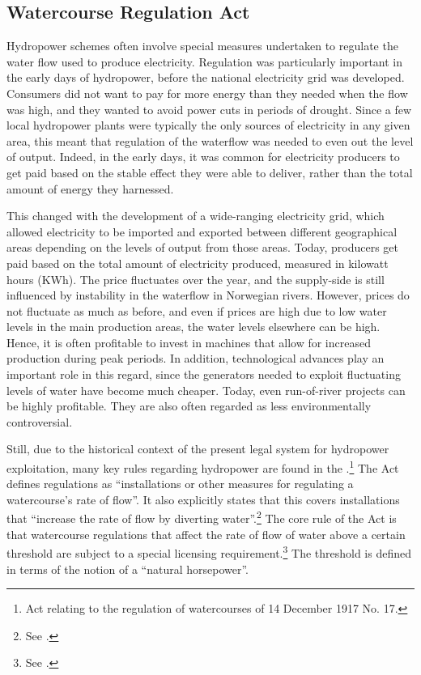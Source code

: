 \subsection{Watercourse Regulation Act}\label{ssec:wra17}

Hydropower schemes often involve special measures undertaken to regulate the water flow used to produce electricity. Regulation was particularly important in the early days of hydropower, before the national electricity grid was developed. Consumers did not want to pay for more energy than they needed when the flow was high, and they wanted to avoid power cuts in periods of drought. Since a few local hydropower plants were typically the only sources of electricity in any given area, this meant that regulation of the waterflow was needed to even out the level of output. Indeed, in the early days, it was common for electricity producers to get paid based on the stable effect they were able to deliver, rather than the total amount of energy they harnessed.

This changed with the development of a wide-ranging electricity grid, which allowed electricity to be imported and exported between different geographical areas depending on the levels of output from those areas. Today, producers get paid based on the total amount of electricity produced, measured in kilowatt hours (KWh). The price fluctuates over the year, and the supply-side is still influenced by instability in the waterflow in Norwegian rivers. However, prices do not fluctuate as much as before, and even if prices are high due to low water levels in the main production areas, the water levels elsewhere can be high. Hence, it is often profitable to invest in machines that allow for increased production during peak periods. In addition, technological advances play an important role in this regard, since the generators needed to exploit fluctuating levels of water have become much cheaper. Today, even run-of-river projects can be highly profitable. They are also often regarded as less environmentally controversial.

Still, due to the historical context of the present legal system for hydropower exploitation, many key rules regarding hydropower are found in the \cite{wra17}.\footnote{Act relating to the regulation of watercourses of 14 December 1917 No. 17.} The Act defines regulations as ``installations or other measures for regulating a watercourse's rate of flow''. It also explicitly states that this covers installations that ``increase the rate of flow by diverting water''.\footnote{See \cite[1]{wra17}.} The core rule of the Act is that watercourse regulations that affect the rate of flow of water above a certain threshold are subject to a special licensing requirement.\footnote{See \cite[2]{wra17}.} The threshold is defined in terms of the notion of a ``natural horsepower''. 

